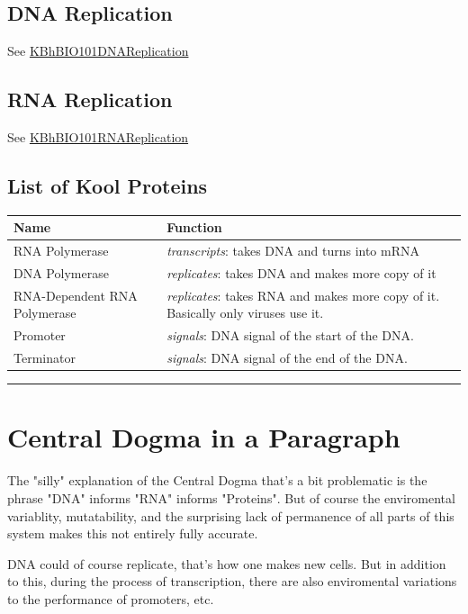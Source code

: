 \documentclass[letterpaper]{article}
\begin{document}
\subsection{DNA Replication}
\label{sec:orgdba14c8}
See \href{KBhBIO101DNAReplication.org}{KBhBIO101DNAReplication}

\subsection{RNA Replication}
\label{sec:org58373fc}
See \href{KBhBIO101RNAReplication.org}{KBhBIO101RNAReplication}

\subsection{List of Kool Proteins}
\label{sec:orgb2d3870}
\begin{center}
\begin{tabular}{ll}
Name & Function\\
\hline
RNA Polymerase & \emph{transcripts}: takes DNA and turns into mRNA\\
DNA Polymerase & \emph{replicates}: takes DNA and makes more copy of it\\
RNA-Dependent RNA Polymerase & \emph{replicates}: takes RNA and makes more copy of it. Basically only viruses use it.\\
Promoter & \emph{signals}: DNA signal of the start of the DNA.\\
Terminator & \emph{signals}: DNA signal of the end of the DNA.\\
\end{tabular}
\end{center}

\noindent\rule{\textwidth}{0.5pt}

\section{Central Dogma in a Paragraph}
\label{sec:orgb84c342}
The "silly" explanation of the Central Dogma that's a bit problematic is
the phrase "DNA" informs "RNA" informs "Proteins". But of course the
enviromental variablity, mutatability, and the surprising lack of
permanence of all parts of this system makes this not entirely fully
accurate.

DNA could of course replicate, that's how one makes new cells. But in
addition to this, during the process of transcription, there are also
enviromental variations to the performance of promoters, etc.
\end{document}
